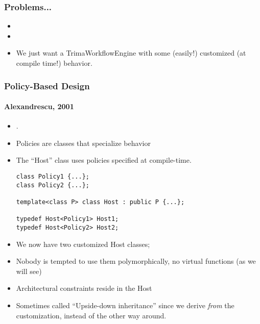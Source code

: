 \begin{frame}[fragile,t]
\frametitle{Problems...}
\begin{itemize}[<+->]
\item {}
\item {}
\item We just want a TrimaWorkflowEngine with some (easily!)
  customized (at compile time!) behavior.
\end{itemize}

\pause
\begin{center}
\end{center}

\end{frame}

\begin{frame}[fragile,t]
\frametitle{Policy-Based Design}
\framesubtitle{Alexandrescu, 2001}
\begin{itemize}[<+->]
  \item {}.
  \item Policies are classes that specialize behavior
  \item The ``Host'' class uses policies specified at compile-time.
{\scriptsize\begin{verbatim}
class Policy1 {...};
class Policy2 {...};

template<class P> class Host : public P {...};

typedef Host<Policy1> Host1;
typedef Host<Policy2> Host2;

\end{verbatim}
}
\item We now have two customized Host classes;
\item Nobody is tempted to use them polymorphically, no virtual
  functions (as we will see)
\item Architectural constraints reside in the Host
\item Sometimes called ``Upside-down inheritance'' since we derive
  \emph{from} the customization, instead of the other way around.

\end{itemize}

\pause
\end{frame}



